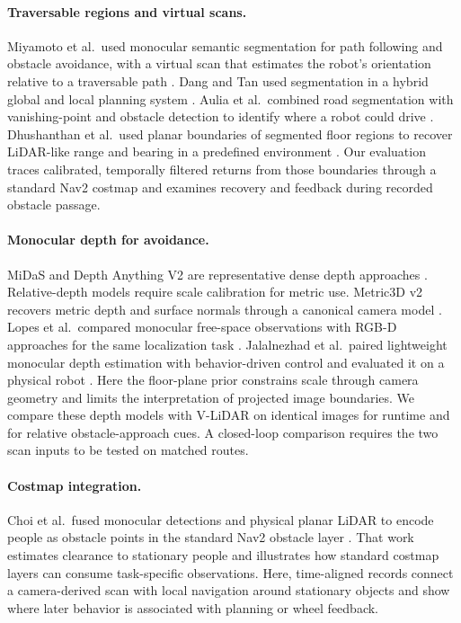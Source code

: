 \documentclass[pdflatex,sn-mathphys-num]{sn-jnl}
\begin{document}
\paragraph{Traversable regions and virtual scans.}
Miyamoto et al.\ used monocular semantic segmentation for path following and obstacle avoidance, with a virtual scan that estimates the robot's orientation relative to a traversable path \cite{miyamoto2020virtual}. Dang and Tan used segmentation in a hybrid global and local planning system \cite{dang2023irdc,dang2024hybrid}. Aulia et al.\ combined road segmentation with vanishing-point and obstacle detection to identify where a robot could drive \cite{aulia2025navigation}. Dhushanthan et al.\ used planar boundaries of segmented floor regions to recover LiDAR-like range and bearing in a predefined environment \cite{dhushanthan2026monocular}. Our evaluation traces calibrated, temporally filtered returns from those boundaries through a standard Nav2 costmap and examines recovery and feedback during recorded obstacle passage.

\paragraph{Monocular depth for avoidance.}
MiDaS and Depth Anything V2 are representative dense depth approaches \cite{ranftl_2020_towards,yang2024depthv2}. Relative-depth models require scale calibration for metric use. Metric3D v2 recovers metric depth and surface normals through a canonical camera model \cite{hu2024metric3dv2}. Lopes et al.\ compared monocular free-space observations with RGB-D approaches for the same localization task \cite{lopes2025free}. Jalalnezhad et al.\ paired lightweight monocular depth estimation with behavior-driven control and evaluated it on a physical robot \cite{jalalnezhad2025avoidance}. Here the floor-plane prior constrains scale through camera geometry and limits the interpretation of projected image boundaries. We compare these depth models with V-LiDAR on identical images for runtime and for relative obstacle-approach cues. A closed-loop comparison requires the two scan inputs to be tested on matched routes.

\paragraph{Costmap integration.}
Choi et al.\ fused monocular detections and physical planar LiDAR to encode people as obstacle points in the standard Nav2 obstacle layer \cite{choi2026costmap}. That work estimates clearance to stationary people and illustrates how standard costmap layers can consume task-specific observations. Here, time-aligned records connect a camera-derived scan with local navigation around stationary objects and show where later behavior is associated with planning or wheel feedback.
\end{document}
